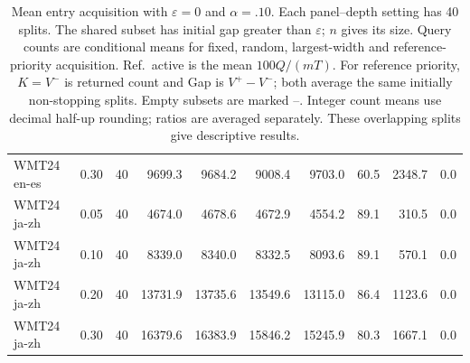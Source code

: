\begin{table}[t]
\begin{tabular}{llrrrrrrrr}
WMT24 en-es & 0.30 & 40 & 9699.3 & 9684.2 & 9008.4 & 9703.0 & 60.5 & 2348.7 & 0.0 \\
WMT24 ja-zh & 0.05 & 40 & 4674.0 & 4678.6 & 4672.9 & 4554.2 & 89.1 & 310.5 & 0.0 \\
WMT24 ja-zh & 0.10 & 40 & 8339.0 & 8340.0 & 8332.5 & 8093.6 & 89.1 & 570.1 & 0.0 \\
WMT24 ja-zh & 0.20 & 40 & 13731.9 & 13735.6 & 13549.6 & 13115.0 & 86.4 & 1123.6 & 0.0 \\
WMT24 ja-zh & 0.30 & 40 & 16379.6 & 16383.9 & 15846.2 & 15245.9 & 80.3 & 1667.1 & 0.0 \\
\bottomrule
\end{tabular}
\caption{Mean entry acquisition with $\varepsilon=0$ and $\alpha=.10$. Each panel--depth setting has 40 splits. The shared subset has initial gap greater than $\varepsilon$; $n$ gives its size. Query counts are conditional means for fixed, random, largest-width and reference-priority acquisition. Ref.\ active is the mean $100Q/(mT)$. For reference priority, $K=V^-$ is returned count and Gap is $V^+-V^-$; both average the same initially non-stopping splits. Empty subsets are marked --. Integer count means use decimal half-up rounding; ratios are averaged separately. These overlapping splits give descriptive results.}
\label{tab:nontrivial-mean-exact}
\end{table}
